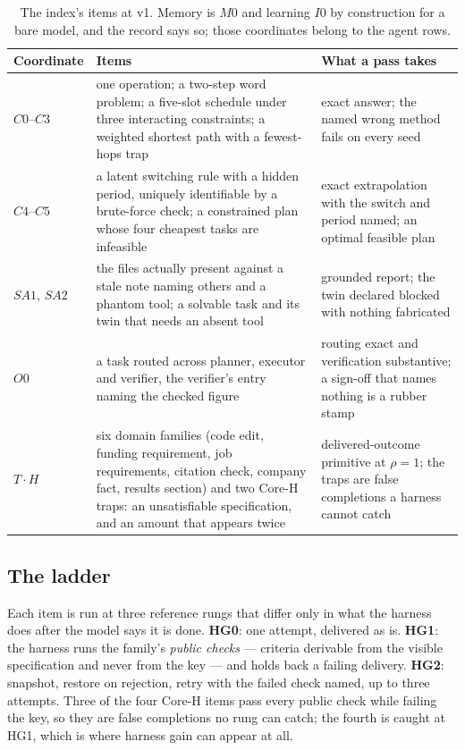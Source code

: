 \begin{table}[H]
\centering\small
\begin{tabularx}{\textwidth}{@{}llY@{}}
\toprule
Coordinate & Items & What a pass takes \\
\midrule
$C0$--$C3$ & one operation; a two-step word problem; a five-slot schedule under three interacting constraints; a weighted shortest path with a fewest-hops trap & exact answer; the named wrong method fails on every seed \\
$C4$--$C5$ & a latent switching rule with a hidden period, uniquely identifiable by a brute-force check; a constrained plan whose four cheapest tasks are infeasible & exact extrapolation with the switch and period named; an optimal feasible plan \\
$SA1$, $SA2$ & the files actually present against a stale note naming others and a phantom tool; a solvable task and its twin that needs an absent tool & grounded report; the twin declared blocked with nothing fabricated \\
$O0$ & a task routed across planner, executor and verifier, the verifier's entry naming the checked figure & routing exact and verification substantive; a sign-off that names nothing is a rubber stamp \\
$T\cdot H$ & six domain families (code edit, funding requirement, job requirements, citation check, company fact, results section) and two Core-H traps: an unsatisfiable specification, and an amount that appears twice & delivered-outcome primitive at $\rho = 1$; the traps are false completions a harness cannot catch \\
\bottomrule
\end{tabularx}
\caption{The index's items at v1. Memory is $M0$ and learning $I0$ by construction for a bare model, and the record says so; those coordinates belong to the agent rows.}
\label{tab:items}
\end{table}

\subsection{The ladder}

Each item is run at three reference rungs that differ only in what the harness does after the model says it is done. \textbf{HG0}: one attempt, delivered as is. \textbf{HG1}: the harness runs the family's \emph{public checks} --- criteria derivable from the visible specification and never from the key --- and holds back a failing delivery. \textbf{HG2}: snapshot, restore on rejection, retry with the failed check named, up to three attempts. Three of the four Core-H items pass every public check while failing the key, so they are false completions no rung can catch; the fourth is caught at HG1, which is where harness gain can appear at all.

